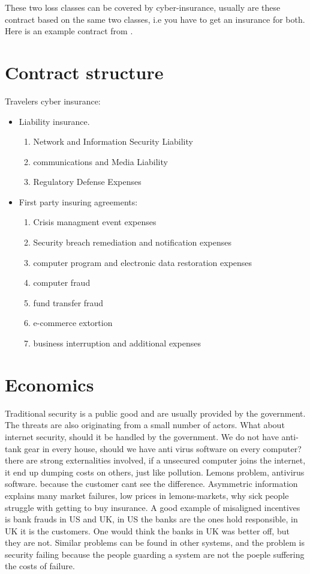 These two loss classes can be covered by cyber-insurance, 
usually are these contract based on the same two classes, i.e you have to get an insurance for both. 
Here is an example contract from \cite{travelers}.
\section{Contract structure}
Travelers cyber insurance:
\begin{itemize}
\item Liability insurance. \begin{enumerate}
\item Network and Information Security Liability
\item communications and Media Liability
\item Regulatory Defense Expenses
\end{enumerate}
\item First party insuring agreements: \begin{enumerate}
\item Crisis managment event expenses
\item Security breach remediation and notification expenses
\item computer program and electronic data restoration expenses
\item computer fraud
\item fund transfer fraud
\item e-commerce extortion
\item business interruption and additional expenses
\end{enumerate}
\end{itemize}
\section{Economics}
Traditional security is a public good and are usually provided by the government. 
The threats are also originating from a small number of actors. 
What about internet security, should it be handled by the government.
 We do not have anti-tank gear in every house, should we have anti virus software on every computer?
 there are strong externalities involved, if a unsecured computer joins the internet, 
 it end up dumping costs on others, just like pollution. 
 Lemons problem, antivirus software. because the customer cant see the difference.
 Asymmetric information explains many market failures, low prices in lemons-markets, why sick people struggle with getting to buy insurance.
 A good example of misaligned incentives is bank frauds in US and UK, in US the banks are the ones hold responsible, in UK it is the customers. One would think the banks in UK was better off, but they are not. Similar problems can be found in other systems, and the problem is  security failing because the people guarding a system are not the poeple suffering the costs of failure. 
